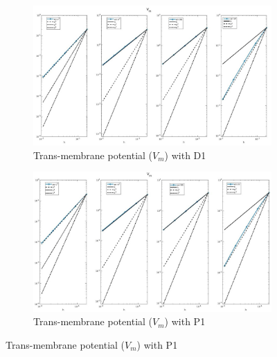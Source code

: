 \documentclass[a4paper,11pt]{article}
\begin{document}
\begin{figure}[H]
\caption{Comparison of the trans-membrane potential ($V_m$)}
\label{Vm_1}
\begin{subfigure}{\textwidth}
\begin{center}
\includegraphics[width = \textwidth]{./D1_Vm_1.jpg}
\caption{ Trans-membrane potential  ($V_m$) with D1}
\end{center}
\end{subfigure}
\begin{subfigure}{\textwidth}
\begin{center}
\includegraphics[width =\textwidth]{./P1_Vm_1.jpg}
\caption{ Trans-membrane potential  ($V_m$) with P1}
\end{center}
\end{subfigure}
\end{figure}
\end{document}
